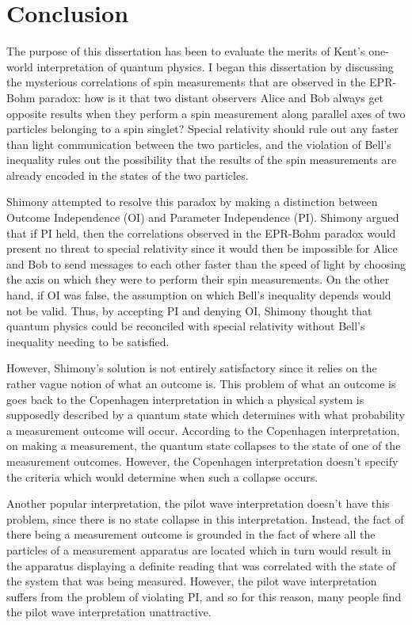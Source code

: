 \chapter*{Conclusion}
The purpose of this dissertation has been to evaluate the merits of Kent's one-world interpretation of quantum physics. I began this dissertation by discussing the mysterious correlations of spin measurements that are observed in the EPR-Bohm paradox: how is it that two distant observers Alice and Bob always get opposite results when they perform a spin measurement along parallel axes of two particles belonging to a spin singlet? Special relativity should rule out any faster than light communication between the two particles, and the violation of Bell's inequality rules out the possibility that the results of the spin measurements are already encoded in the states of the two particles.

Shimony attempted to resolve this paradox by making a distinction between Outcome Independence (OI) and Parameter Independence (PI). Shimony argued that if PI held, then the correlations observed in the EPR-Bohm paradox would present no threat to special relativity since it would then be impossible for Alice and Bob to send messages to each other faster than the speed of light by choosing the axis on which they were to perform their spin measurements. On the other hand, if OI was false, the assumption on which Bell's inequality depends would not be valid. Thus, by accepting PI and denying OI, Shimony thought that quantum physics could be reconciled with special relativity without Bell's inequality needing to be satisfied.

However, Shimony's solution is not entirely satisfactory since it relies on the rather vague notion of what an outcome is. This problem of what an outcome is goes back to the Copenhagen interpretation in which a physical system is supposedly described by a quantum state which determines with what probability a measurement outcome will occur. According to the Copenhagen interpretation, on making a measurement, the quantum state collapses to the state of one of the measurement outcomes. However, the Copenhagen interpretation doesn't specify the criteria which would determine when such a collapse occurs. 

Another popular interpretation, the pilot wave interpretation doesn't have this problem, since there is no state collapse in this interpretation. Instead, the fact of there being a measurement outcome is grounded in the fact of where all the particles of a measurement apparatus are located which in turn would result in the apparatus displaying a definite reading that was correlated with the state of the system that was being measured.  However, the pilot wave interpretation suffers from the problem of violating PI, and so for this reason, many people find the pilot wave interpretation unattractive. 

